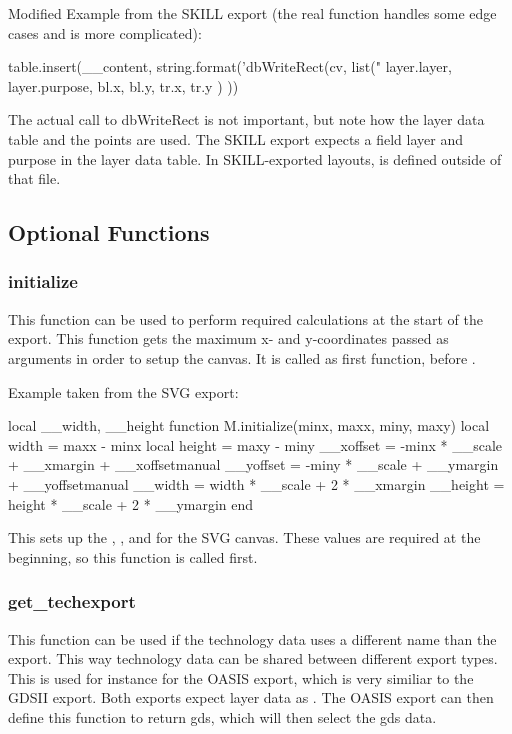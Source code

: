 Modified Example from the SKILL export (the real function handles some edge cases and is more complicated):
\begin{lualisting}
    table.insert(__content,
        string.format('dbWriteRect(cv, list("%
            layer.layer, layer.purpose,
            bl.x, bl.y,
            tr.x, tr.y
        )
    ))
\end{lualisting}
The actual call to dbWriteRect is not important, but note how the layer data table and the points are used.
The SKILL export expects a field layer and purpose in the layer data table.
In SKILL-exported layouts,  is defined outside of that file.

\subsection{Optional Functions}
\subsubsection{initialize}
This function can be used to perform required calculations at the start of the export.
This function gets the maximum x- and y-coordinates passed as arguments in order to setup the canvas.
It is called as first function, before .

Example taken from the SVG export:
\begin{lualisting}
    local __width, __height
    function M.initialize(minx, maxx, miny, maxy)
        local width = maxx - minx
        local height = maxy - miny
        __xoffset = -minx * __scale + __xmargin + __xoffsetmanual
        __yoffset = -miny * __scale + __ymargin + __yoffsetmanual
        __width = width * __scale + 2 * __xmargin
        __height = height * __scale + 2 * __ymargin
    end
\end{lualisting}
This sets up the , ,  and  for the SVG canvas.
These values are required at the beginning, so this function is called first.

\subsubsection{get\_techexport}
This function can be used if the technology data uses a different name than the export.
This way technology data can be shared between different export types.
This is used for instance for the OASIS export, which is very similiar to the GDSII export.
Both exports expect layer data as .
The OASIS export can then define this function to return gds, which will then select the gds data.

